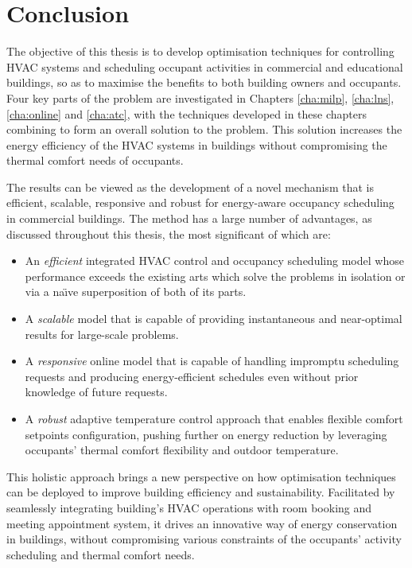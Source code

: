 \chapter{Conclusion}
\label{cha:conc}


The objective of this thesis is to develop optimisation techniques for controlling HVAC systems and scheduling occupant activities in commercial and educational buildings, so as to maximise the benefits to both building owners and occupants.
Four key parts of the problem are investigated in Chapters \ref{cha:milp}, \ref{cha:lns}, \ref{cha:online} and \ref{cha:atc}, with the techniques developed in these chapters combining to form an overall solution to the problem. This solution increases the energy efficiency of the HVAC systems in buildings without compromising the thermal comfort needs of occupants. %

The results can be viewed as the development of a novel mechanism that is efficient, scalable, responsive and robust for energy-aware occupancy scheduling in commercial buildings. The method has a large number of advantages, as discussed throughout this thesis, the most significant of which are:

\begin{itemize}
	\item An \textsl{efficient} integrated HVAC control and occupancy scheduling model whose performance exceeds the existing arts which solve the problems in isolation or via a na\"{\i}ve superposition of both of its parts.
	\item A \textsl{scalable} model that is capable of providing instantaneous and near-optimal results for large-scale problems.
	\item A \textsl{responsive} online model that is capable of handling impromptu scheduling requests and producing energy-efficient schedules even without prior knowledge of future requests.
	\item A \textsl{robust} adaptive temperature control approach that enables flexible comfort setpoints configuration, pushing further on energy reduction by leveraging occupants' thermal comfort flexibility and outdoor temperature.
\end{itemize}

This holistic approach brings a new perspective on how optimisation techniques can be deployed to improve building efficiency and sustainability. Facilitated by seamlessly integrating building's HVAC operations with room booking and meeting appointment system, it drives an innovative way of energy conservation in buildings, without compromising various constraints of the occupants' activity scheduling and thermal comfort needs.


